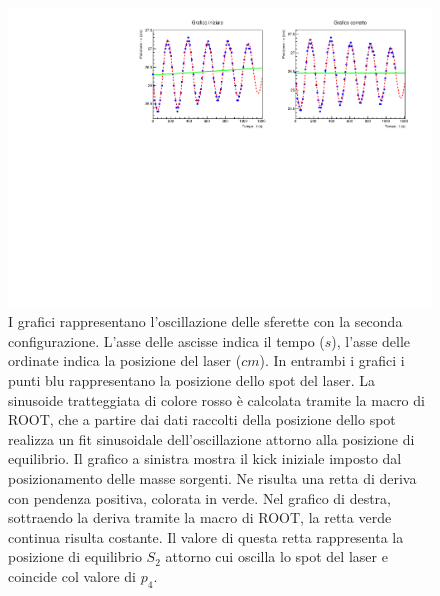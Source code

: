 \documentclass{article}
\begin{document}
\begin{figure}[ht!]
    \centering
    \includegraphics[width=1\linewidth]{images/graphS2.pdf}
    \caption{I grafici rappresentano l'oscillazione delle sferette con la seconda configurazione. L'asse delle ascisse indica il tempo ($s$), l'asse delle ordinate indica la posizione del laser ($cm$). In entrambi i grafici i punti blu rappresentano la posizione dello spot del laser. La sinusoide tratteggiata di colore rosso è calcolata tramite la macro di ROOT, che a partire dai dati raccolti della posizione dello spot realizza un fit sinusoidale dell'oscillazione attorno alla posizione di equilibrio. Il grafico a sinistra mostra il kick iniziale imposto dal posizionamento delle masse sorgenti. Ne risulta una retta di deriva con pendenza positiva, colorata in verde. Nel grafico di destra, sottraendo la deriva tramite la macro di ROOT, la retta verde continua risulta costante. Il valore di questa retta rappresenta la posizione di equilibrio $S_2$ attorno cui oscilla lo spot del laser e coincide col valore di $p_4$.}
    \label{fig:graph_2}
\end{figure}

\newpage
\end{document}
